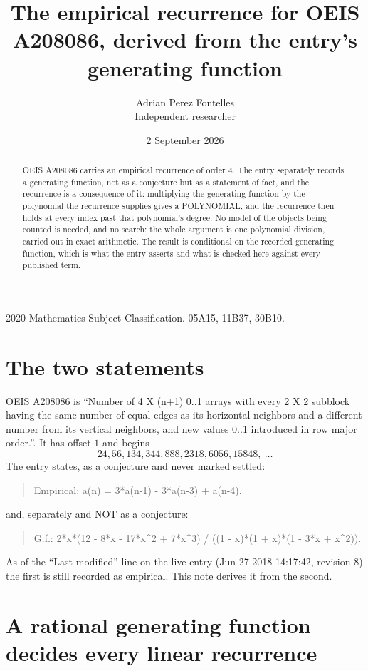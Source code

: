 \documentclass[11pt,a4paper]{article}
\title{The empirical recurrence for OEIS A208086, derived from the entry's generating function}
\author{Adrian Perez Fontelles\\ \small Independent researcher}
\date{2 September 2026}
\theoremstyle{plain}
\theoremstyle{definition}
\begin{document}
\maketitle

\begin{abstract}
OEIS A208086 carries an empirical recurrence of order $4$. The entry separately records a
generating function, not as a conjecture but as a statement of fact, and the recurrence is a
consequence of it: multiplying the generating function by the polynomial the recurrence
supplies gives a POLYNOMIAL, and the recurrence then holds at every index past that
polynomial's degree. No model of the objects being counted is needed, and no search: the
whole argument is one polynomial division, carried out in exact arithmetic. The result is
conditional on the recorded generating function, which is what the entry asserts and what is
checked here against every published term.
\end{abstract}

\noindent\small 2020 Mathematics Subject Classification. 05A15, 11B37, 30B10.\normalsize

\section{The two statements}

OEIS A208086 is ``Number of 4 X (n+1) 0..1 arrays with every 2 X 2 subblock having the same number of equal edges as its horizontal neighbors and a different number from its vertical neighbors, and new values 0..1 introduced in row major order.''. It has offset $1$ and begins
\[
24, 56, 134, 344, 888, 2318, 6056, 15848,\ \dots
\]
The entry states, as a conjecture and never marked settled:
\begin{quote}
Empirical: a(n) = 3*a(n-1) - 3*a(n-3) + a(n-4).
\end{quote}
and, separately and NOT as a conjecture:
\begin{quote}
G.f.: 2*x*(12 - 8*x - 17*x\^{}2 + 7*x\^{}3) / ((1 - x)*(1 + x)*(1 - 3*x + x\^{}2)).
\end{quote}
As of the ``Last modified'' line on the live entry (Jun 27 2018 14:17:42, revision 8) the first is still
recorded as empirical. This note derives it from the second.

\section{A rational generating function decides every linear recurrence}
\end{document}
